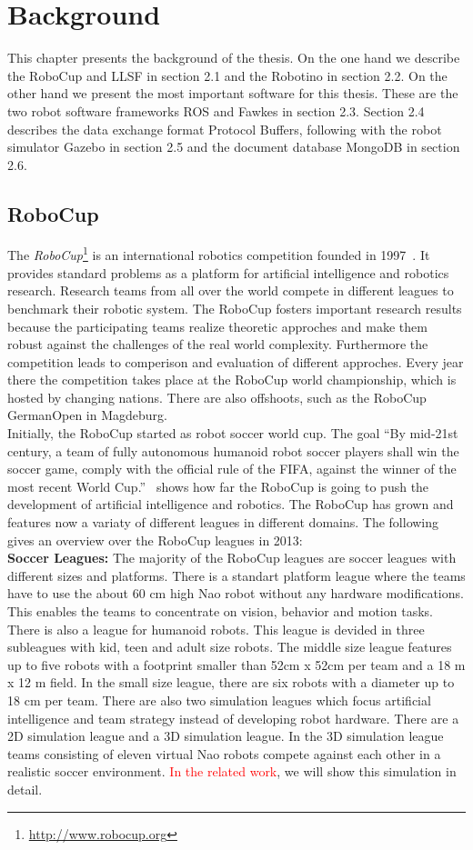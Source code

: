 \chapter{Background}
This chapter presents the background of the thesis. On the one hand we describe the RoboCup and LLSF in section 2.1 and the Robotino in section 2.2. On the other hand we present the most important software for this thesis. These are the two robot software frameworks ROS and Fawkes in section 2.3. Section 2.4 describes the data exchange format Protocol Buffers, following with the robot simulator Gazebo in section 2.5 and the document database MongoDB in section 2.6.


\section{RoboCup}
The \textit{RoboCup}\footnote{\url{http://www.robocup.org}} is an international robotics competition founded in 1997~\cite{Robocup}. It provides standard problems as a platform for artificial intelligence and robotics research. Research teams from all over the world compete in different leagues to benchmark their robotic system. The RoboCup fosters important research results because the participating teams realize theoretic approches and make them robust against the challenges of the real world complexity. Furthermore the competition leads to comperison and evaluation of different approches. Every jear there the competition takes place at the RoboCup world championship, which is hosted by changing nations. There are also offshoots, such as the RoboCup GermanOpen in Magdeburg.\\
Initially, the RoboCup started as robot soccer world cup. The goal ``By mid-21st century, a team of fully autonomous humanoid robot soccer players shall win the soccer game, comply with the official rule of the FIFA, against the winner of the most recent World Cup.''~\cite{robocup_goal} shows how far the RoboCup is going to push the development of artificial intelligence and robotics. The RoboCup has grown and features now a variaty of different leagues in different domains. The following gives an overview over the RoboCup leagues in 2013:\\
\textbf{Soccer Leagues:} The majority of the RoboCup leagues are soccer leagues with different sizes and platforms. There is a standart platform league where the teams have to use the about 60 cm high Nao robot without any hardware modifications. This enables the teams to concentrate on vision, behavior and motion tasks. There is also a league for humanoid robots. This league is devided in three subleagues with kid, teen and adult size robots. The middle size league features up to five robots with a footprint smaller than 52cm x 52cm per team and a 18 m x 12 m field. In the small size league, there are six robots with a diameter up to 18 cm per team. There are also two simulation leagues which focus artificial intelligence and team strategy instead of developing robot hardware. There are a 2D simulation league and a 3D simulation league. In the 3D simulation league teams consisting of eleven virtual Nao robots compete against each other in a realistic soccer environment. \textcolor{red}{In the related work}, we will show this simulation in detail.\\
